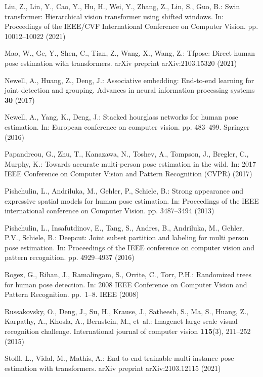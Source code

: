 \documentclass[runningheads]{llncs}
\begin{document}
\begin{thebibliography}{10}
Liu, Z., Lin, Y., Cao, Y., Hu, H., Wei, Y., Zhang, Z., Lin, S., Guo, B.: Swin
  transformer: Hierarchical vision transformer using shifted windows. In:
  Proceedings of the IEEE/CVF International Conference on Computer Vision. pp.
  10012--10022 (2021)

Mao, W., Ge, Y., Shen, C., Tian, Z., Wang, X., Wang, Z.: Tfpose: Direct human
  pose estimation with transformers. arXiv preprint arXiv:2103.15320  (2021)

Newell, A., Huang, Z., Deng, J.: Associative embedding: End-to-end learning for
  joint detection and grouping. Advances in neural information processing
  systems  \textbf{30} (2017)

Newell, A., Yang, K., Deng, J.: Stacked hourglass networks for human pose
  estimation. In: European conference on computer vision. pp. 483--499.
  Springer (2016)

Papandreou, G., Zhu, T., Kanazawa, N., Toshev, A., Tompson, J., Bregler, C.,
  Murphy, K.: Towards accurate multi-person pose estimation in the wild. In:
  2017 IEEE Conference on Computer Vision and Pattern Recognition (CVPR) (2017)

Pishchulin, L., Andriluka, M., Gehler, P., Schiele, B.: Strong appearance and
  expressive spatial models for human pose estimation. In: Proceedings of the
  IEEE international conference on Computer Vision. pp. 3487--3494 (2013)

Pishchulin, L., Insafutdinov, E., Tang, S., Andres, B., Andriluka, M., Gehler,
  P.V., Schiele, B.: Deepcut: Joint subset partition and labeling for multi
  person pose estimation. In: Proceedings of the IEEE conference on computer
  vision and pattern recognition. pp. 4929--4937 (2016)

Rogez, G., Rihan, J., Ramalingam, S., Orrite, C., Torr, P.H.: Randomized trees
  for human pose detection. In: 2008 IEEE Conference on Computer Vision and
  Pattern Recognition. pp.~1--8. IEEE (2008)

Russakovsky, O., Deng, J., Su, H., Krause, J., Satheesh, S., Ma, S., Huang, Z.,
  Karpathy, A., Khosla, A., Bernstein, M., et~al.: Imagenet large scale visual
  recognition challenge. International journal of computer vision
  \textbf{115}(3),  211--252 (2015)

Stoffl, L., Vidal, M., Mathis, A.: End-to-end trainable multi-instance pose
  estimation with transformers. arXiv preprint arXiv:2103.12115  (2021)


\end{thebibliography}
\end{document}
